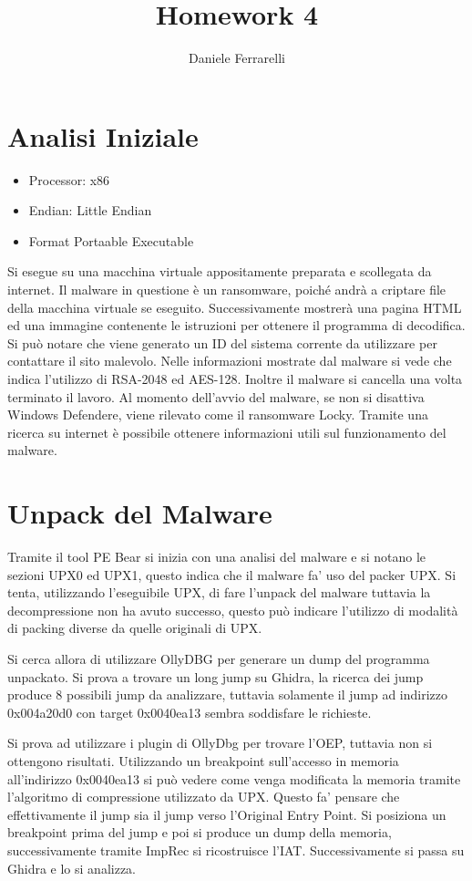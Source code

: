 \documentclass[]{article}
\title{Homework 4}
\author{Daniele Ferrarelli}
\date{}
\begin{document}
\maketitle
\tableofcontents

\section{Analisi Iniziale}
\begin{itemize}
	\item Processor: x86
	\item Endian: Little Endian
	\item Format Portaable Executable
\end{itemize}

Si esegue su una macchina virtuale appositamente preparata e scollegata  da internet. Il malware in questione è un ransomware, poiché andrà a criptare file della macchina virtuale se eseguito. Successivamente mostrerà una pagina HTML ed una immagine contenente le istruzioni per ottenere il programma di decodifica. Si può notare che viene generato un ID del sistema corrente da utilizzare per contattare il sito malevolo. Nelle informazioni mostrate dal malware si vede che indica l'utilizzo di RSA-2048 ed AES-128.  Inoltre il malware si cancella una volta terminato il lavoro. Al momento dell'avvio del malware, se non si disattiva Windows Defendere, viene rilevato come il ransomware Locky. Tramite una ricerca su internet è possibile ottenere informazioni utili sul funzionamento del malware. 

\section{Unpack del Malware}
Tramite il tool PE Bear si inizia con una analisi del malware e si notano le sezioni UPX0 ed UPX1, questo indica che il malware fa' uso del packer UPX. Si tenta, utilizzando l'eseguibile UPX, di fare l'unpack del malware tuttavia la decompressione non ha avuto successo, questo può indicare l'utilizzo di modalità di packing diverse da quelle originali di UPX.

Si cerca allora di utilizzare OllyDBG per generare un dump del programma unpackato. Si prova a trovare un long jump su Ghidra, la ricerca dei jump produce 8 possibili jump da analizzare, tuttavia solamente il jump ad indirizzo 0x004a20d0 con target 0x0040ea13 sembra soddisfare le richieste. 

Si prova ad utilizzare i plugin di OllyDbg per trovare l'OEP, tuttavia non si ottengono risultati.
Utilizzando un breakpoint sull'accesso in memoria all'indirizzo 0x0040ea13 si può vedere come venga modificata la memoria tramite l'algoritmo di compressione utilizzato da UPX. Questo fa' pensare che effettivamente il jump sia il jump verso l'Original Entry Point. Si posiziona un breakpoint prima del jump e poi si produce un dump della memoria, successivamente tramite ImpRec si ricostruisce l'IAT.
Successivamente si passa su Ghidra e lo si analizza.
\end{document}
